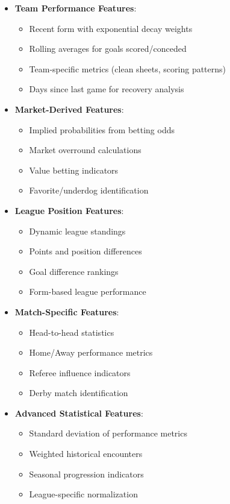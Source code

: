 \documentclass[conference]{IEEEtran}
\begin{document}
\begin{itemize}
    \item \textbf{Team Performance Features}:
        \begin{itemize}
            \item Recent form with exponential decay weights
            \item Rolling averages for goals scored/conceded
            \item Team-specific metrics (clean sheets, scoring patterns)
            \item Days since last game for recovery analysis
        \end{itemize}
    
    \item \textbf{Market-Derived Features}:
        \begin{itemize}
            \item Implied probabilities from betting odds
            \item Market overround calculations
            \item Value betting indicators
            \item Favorite/underdog identification
        \end{itemize}
    
    \item \textbf{League Position Features}:
        \begin{itemize}
            \item Dynamic league standings
            \item Points and position differences
            \item Goal difference rankings
            \item Form-based league performance
        \end{itemize}
    
    \item \textbf{Match-Specific Features}:
        \begin{itemize}
            \item Head-to-head statistics
            \item Home/Away performance metrics
            \item Referee influence indicators
            \item Derby match identification
        \end{itemize}
    
    \item \textbf{Advanced Statistical Features}:
        \begin{itemize}
            \item Standard deviation of performance metrics
            \item Weighted historical encounters
            \item Seasonal progression indicators
            \item League-specific normalization
        \end{itemize}
\end{itemize}
\end{document}
